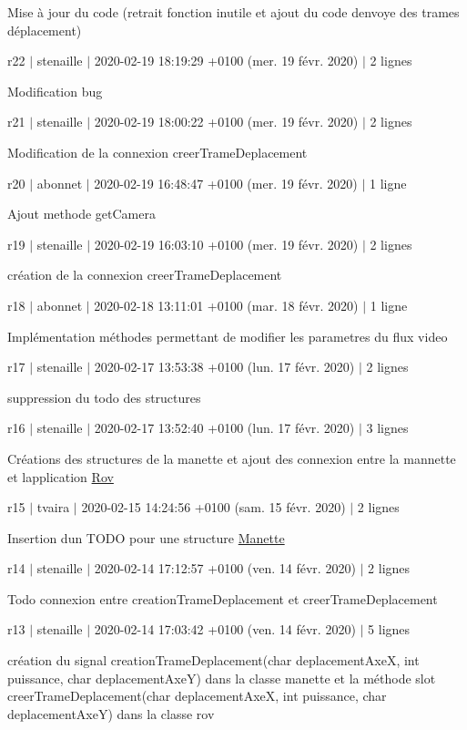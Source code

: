 Mise à jour du code (retrait fonction inutile et ajout du code d\textquotesingle{}envoye des trames déplacement)

r22 $\vert$ stenaille $\vert$ 2020-\/02-\/19 18\+:19\+:29 +0100 (mer. 19 févr. 2020) $\vert$ 2 lignes

Modification bug

r21 $\vert$ stenaille $\vert$ 2020-\/02-\/19 18\+:00\+:22 +0100 (mer. 19 févr. 2020) $\vert$ 2 lignes

Modification de la connexion creer\+Trame\+Deplacement

r20 $\vert$ abonnet $\vert$ 2020-\/02-\/19 16\+:48\+:47 +0100 (mer. 19 févr. 2020) $\vert$ 1 ligne

Ajout methode get\+Camera

r19 $\vert$ stenaille $\vert$ 2020-\/02-\/19 16\+:03\+:10 +0100 (mer. 19 févr. 2020) $\vert$ 2 lignes

création de la connexion creer\+Trame\+Deplacement

r18 $\vert$ abonnet $\vert$ 2020-\/02-\/18 13\+:11\+:01 +0100 (mar. 18 févr. 2020) $\vert$ 1 ligne

Implémentation méthodes permettant de modifier les parametres du flux video

r17 $\vert$ stenaille $\vert$ 2020-\/02-\/17 13\+:53\+:38 +0100 (lun. 17 févr. 2020) $\vert$ 2 lignes

suppression du todo des structures

r16 $\vert$ stenaille $\vert$ 2020-\/02-\/17 13\+:52\+:40 +0100 (lun. 17 févr. 2020) $\vert$ 3 lignes

Créations des structures de la manette et ajout des connexion entre la mannette et l\textquotesingle{}application \hyperlink{class_rov}{Rov}

r15 $\vert$ tvaira $\vert$ 2020-\/02-\/15 14\+:24\+:56 +0100 (sam. 15 févr. 2020) $\vert$ 2 lignes

Insertion d\textquotesingle{}un T\+O\+DO pour une structure \hyperlink{class_manette}{Manette}

r14 $\vert$ stenaille $\vert$ 2020-\/02-\/14 17\+:12\+:57 +0100 (ven. 14 févr. 2020) $\vert$ 2 lignes

Todo connexion entre creation\+Trame\+Deplacement et creer\+Trame\+Deplacement

r13 $\vert$ stenaille $\vert$ 2020-\/02-\/14 17\+:03\+:42 +0100 (ven. 14 févr. 2020) $\vert$ 5 lignes

création du signal creation\+Trame\+Deplacement(char deplacement\+AxeX, int puissance, char deplacement\+AxeY) dans la classe manette et la méthode slot creer\+Trame\+Deplacement(char deplacement\+AxeX, int puissance, char deplacement\+AxeY) dans la classe rov

